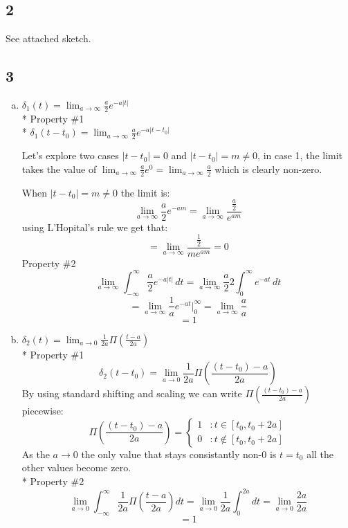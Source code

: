 \documentclass[10pt, letterpaper]{article}
\begin{document}
\subsection*{2} 
See attached sketch.


\subsection*{3}
\begin{enumerate}[a.]
\item
$\delta_1(t) = \lim_{a \to \infty} \frac{a}{2} e^{-a|t|}$\\*
Property \#1 \\*
$\delta_1(t - t_0) = \lim_{a \to \infty} \frac{a}{2} e^{-a|t - t_0|}$

Let's explore two cases $|t - t_0| = 0$ and $|t - t_0| = m \neq 0$, in case 1, 
the limit takes the value of $\lim_{a \to \infty} \frac{a}{2} e^{0} = \lim_{a \to \infty} \frac{a}{2}$ 
which is clearly non-zero.

When $|t - t_0| = m \neq 0$ the limit is:
\[
\lim_{a \to \infty} \frac{a}{2} e^{-am} = 
\lim_{a \to \infty} \frac{\frac{a}{2} }{e^{am}}
\]
using L'Hopital's rule we get that:
\[ =
\lim_{a \to \infty} \frac{\frac{1}{2} }{me^{am}} = 0
\]
Property \#2
\[
\lim_{a \to \infty} \int_{-\infty}^{\infty}\frac{a}{2} e^{-a|t|}\,dt = 
\lim_{a \to \infty} \frac{a}{2} 2 \int_{0}^{\infty} e^{-at}\,dt 
\]
\[
= \lim_{a \to \infty} \frac{1}{a} e^{-at} |_{0}^{\infty}
= \lim_{a \to \infty} \frac{a}{a}
\]
\[= 1\]

\item
$\delta_2(t) = \lim_{a \to 0} \frac{1}{2a} \Pi(\frac{t - a}{2a})$\\*
Property \#1
\[
\delta_2(t - t_0) = \lim_{a \to 0} \frac{1}{2a} \Pi(\frac{(t -t_0) - a}{2a})
\]
By using standard shifting and scaling we can write $\Pi(\frac{(t -t_0) - a}{2a})$ piecewise:
\[\Pi(\frac{(t -t_0) - a}{2a}) = \left\{
  \begin{array}{lr}
    1 & : t \in [t_0, t_0 + 2a]\\
    0 & : t \not\in [t_0, t_0 + 2a]
  \end{array}
\right.
\]
As the $a \to 0$ the only value that stays consistantly non-0 is $t = t_0$
all the other values become zero.
\\*
Property \#2
\[
\lim_{a \to 0} \int_{-\infty}^{\infty}\frac{1}{2a} \Pi(\frac{t - a}{2a})dt = 
\lim_{a \to 0} \frac{1}{2a} \int_{0}^{2a}dt 
= \lim_{a \to 0} \frac{2a}{2a} 
\]
\[= 1\]
\end{enumerate}
\end{document}
